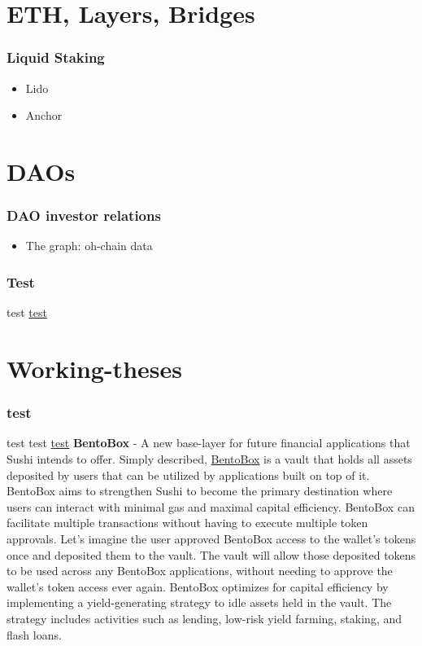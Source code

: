 \documentclass{../notes}
\begin{document}
\part{ETH, Layers, Bridges}
\section{Liquid Staking}
\begin{itemize}
    \item Lido
    \item Anchor
\end{itemize}

\part{DAOs}
\section{DAO investor relations}
\begin{itemize}
    \item The graph: oh-chain data
\end{itemize}

\section{Test}
test \href{https://www.overleaf.com/learn/latex/Hyperlinks}{test}

\part{Working-theses}
\section{test}
test test \href{run:./messari-2022-crypto-theses.pdf}{test}
\textbf{BentoBox} - A new base-layer for future financial applications
that Sushi intends to offer. Simply described,
{\href{https://messari.io/article/sushi-bentobox-kashi-the-first-piece?referrer=asset:sushiswap}{BentoBox}}
is a vault that holds all assets deposited by users that can be utilized
by applications built on top of it. BentoBox aims to strengthen Sushi to
become the primary destination where users can interact with minimal gas
and maximal capital efficiency. BentoBox can facilitate multiple
transactions without having to execute multiple token approvals. Let's
imagine the user approved BentoBox access to the wallet's tokens once
and deposited them to the vault. The vault will allow those deposited
tokens to be used across any BentoBox applications, without needing to
approve the wallet's token access ever again. BentoBox optimizes for
capital efficiency by implementing a yield-generating strategy to idle
assets held in the vault. The strategy includes activities such as
lending, low-risk yield farming, staking, and flash loans.
\end{document}

